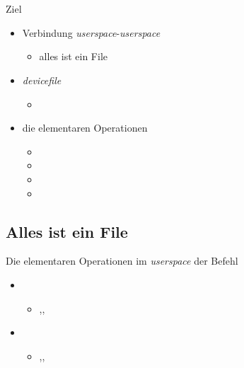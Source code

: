 \section{}
\begin{frame}{Ziel}{}
 \begin{itemize}
  \item Verbindung {\em userspace}-{\em userspace}
  \begin{itemize}
   \item alles ist ein File
  \end{itemize}
  \item {\em devicefile} 
  \begin{itemize}
   \item {}
  \end{itemize}
  \item die elementaren Operationen
  \begin{itemize}
   \item {}
   \item {}
   \item {}
   \item {}
  \end{itemize}
 \end{itemize}
\end{frame}
\subsection{Alles ist ein File}
\begin{frame}{Die elementaren Operationen im {\em userspace}}
             {der Befehl }
  \begin{itemize}
   \item {}
   \begin{itemize}
    \item {},,
   \end{itemize}
   \item {}
   \begin{itemize}
    \item {},,
   \end{itemize}
  \end{itemize}
\end{frame}

